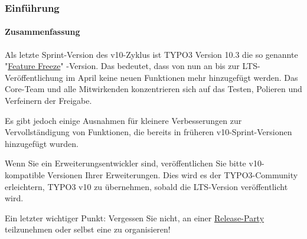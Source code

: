 \begin{frame}[fragile]
	\frametitle{Einführung}
	\framesubtitle{Zusammenfassung}

	\small
		Als letzte Sprint-Version des v10-Zyklus ist TYPO3 Version 10.3 die so genannte
		"\href{https://typo3.org/article/land-ho-feature-freeze-ahead}{Feature Freeze}"
		-Version. Das bedeutet, dass von nun an bis zur LTS-Veröffentlichung im April
		keine neuen Funktionen mehr hinzugefügt werden. Das Core-Team und alle Mitwirkenden konzentrieren sich auf das Testen, Polieren und Verfeinern der Freigabe.

		\vspace{0.2cm}

		Es gibt jedoch einige Ausnahmen für kleinere Verbesserungen zur Vervollständigung von Funktionen, die
		bereits in früheren v10-Sprint-Versionen hinzugefügt wurden.

		\vspace{0.2cm}

		Wenn Sie ein Erweiterungsentwickler sind, veröffentlichen Sie bitte v10-kompatible Versionen Ihrer 
		Erweiterungen. Dies wird es der TYPO3-Community erleichtern, TYPO3 v10 zu übernehmen, sobald die
		LTS-Version veröffentlicht wird.

		\vspace{0.2cm}

		Ein letzter wichtiger Punkt: Vergessen Sie nicht, an einer
		\href{https://typo3.org/community/events/v10-parties}{Release-Party} teilzunehmen oder selbst eine
		zu organisieren!

	\normalsize

\end{frame}



